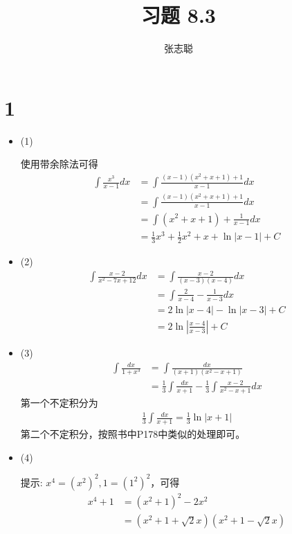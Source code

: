 \documentclass{article}
\begin{document}
\title{习题 8.3}
\author{张志聪}
\maketitle

\section*{1}

\begin{itemize}
  \item (1)

        使用带余除法可得
        \begin{align*}
          \int \frac{x^3}{x - 1} dx
           & = \int \frac{(x-1)(x^2 + x + 1) + 1}{x - 1} dx          \\
           & = \int \frac{(x-1)(x^2 + x + 1) + 1}{x - 1} dx          \\
           & = \int (x^2 + x + 1) + \frac{1}{x - 1} dx               \\
           & = \frac{1}{3}x^3 + \frac{1}{2}x^2 + x + \ln |x - 1| + C
        \end{align*}

  \item (2)
        \begin{align*}
          \int \frac{x - 2}{x^2 - 7x + 12} dx
           & = \int \frac{x - 2}{(x - 3)(x - 4)} dx       \\
           & = \int \frac{2}{x - 4} - \frac{1}{x - 3} dx  \\
           & = 2 \ln |x - 4| - \ln |x - 3| + C            \\
           & = 2 \ln \left|\frac{x - 4}{x - 3}\right| + C
        \end{align*}

  \item (3)
        \begin{align*}
          \int \frac{dx}{1 + x^3}
           & = \int \frac{dx}{(x + 1)(x^2 - x + 1)}                                             \\
           & = \frac{1}{3} \int \frac{dx}{x + 1} - \frac{1}{3}\int \frac{x - 2}{x^2 - x + 1} dx
        \end{align*}
        第一个不定积分为
        \begin{align*}
          \frac{1}{3} \int \frac{dx}{x + 1} = \frac{1}{3} \ln |x + 1|
        \end{align*}
        第二个不定积分，按照书中P178中类似的处理即可。

  \item (4)

        提示: $x^4 = (x^2)^2, 1 = (1^2)^2$，可得
        \begin{align*}
          x^4 + 1 & = (x^2 + 1)^2 - 2 x^2                        \\
                  & = (x^2 + 1 + \sqrt{2}x)(x^2 + 1 - \sqrt{2}x)
        \end{align*}

\end{itemize}
\end{document}
